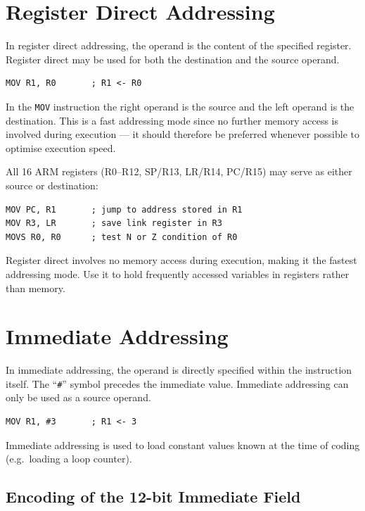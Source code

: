 \documentclass[11pt, a4paper, notitlepage]{report}
\theoremstyle{definition}
\theoremstyle{remark}
\theoremstyle{definition}
\begin{document}
\section{Register Direct Addressing}

In register direct addressing, the operand is the content of the specified register. Register direct may be used for both the destination and the source operand.

\begin{lstlisting}
MOV R1, R0       ; R1 <- R0
\end{lstlisting}

In the \texttt{MOV} instruction the right operand is the source and the left operand is the destination. This is a fast addressing mode since no further memory access is involved during execution --- it should therefore be preferred whenever possible to optimise execution speed.

All 16 ARM registers (R0--R12, SP/R13, LR/R14, PC/R15) may serve as either source or destination:

\begin{lstlisting}
MOV PC, R1       ; jump to address stored in R1
MOV R3, LR       ; save link register in R3
MOVS R0, R0      ; test N or Z condition of R0
\end{lstlisting}

\begin{keyresult}[title={Register Direct is Fastest}]
Register direct involves no memory access during execution, making it the fastest addressing mode. Use it to hold frequently accessed variables in registers rather than memory.
\end{keyresult}

\section{Immediate Addressing}

In immediate addressing, the operand is directly specified within the instruction itself. The ``\texttt{\#}'' symbol precedes the immediate value. Immediate addressing can only be used as a source operand.

\begin{lstlisting}
MOV R1, #3       ; R1 <- 3
\end{lstlisting}

Immediate addressing is used to load constant values known at the time of coding (e.g.\ loading a loop counter).

\subsection{Encoding of the 12-bit Immediate Field}
\end{document}
